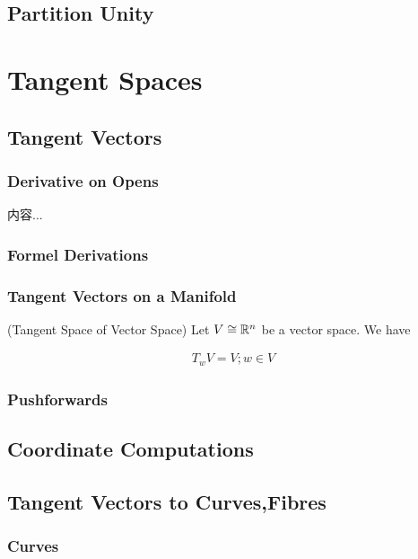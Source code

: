 \documentclass[Total.tex]{subfiles}
\begin{document}
		\section{Partition Unity}
	\chapter{Tangent Spaces}
		\section{Tangent Vectors}
			\subsection{Derivative on Opens}
				
				\begin{Def}
					内容...
				\end{Def}
				
			\subsection{Formel Derivations}
			
			\subsection{Tangent Vectors on a Manifold}
				
				\begin{example}
					(Tangent Space of Vector Space) Let $V\cong \mathbb{R}^n$ be a vector space. We have
					
					\begin{gather*}
						T_wV=V;w\in V
					\end{gather*} 
				\end{example}
			\subsection{Pushforwards}
		\section{Coordinate Computations}
		\section{Tangent Vectors to Curves,Fibres}
			\subsection{Curves}
\end{document}
